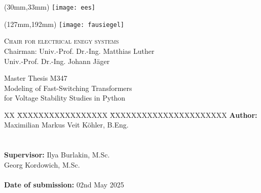 \thispagestyle{empty}
\setcounter{page}{-1}

\begin{textblock*}{\textwidth}(30mm,33mm)
\texttt{[image: ees]}
\end{textblock*}

\begin{textblock*}{\textwidth}(127mm,192mm)
\texttt{[image: fausiegel]}
\end{textblock*}

{\raggedleft
\textsc{Chair for electrical enegy systems}\\
Chairman: Univ.-Prof. Dr.-Ing. Matthias Luther \\
Univ.-Prof. Dr.-Ing. Johann Jäger
\par}

\vspace{51mm}

{\centering

\large{Master Thesis M347} \\	
\Large{Modeling of Fast-Switching Transformers\\for Voltage Stability Studies in Python}

\par}

\vfill

{\raggedright
\begin{tabbing}
XX \= XXXXXXXXXXXXXXXXX \= XXXXXXXXXXXXXXXXXXXXXX \kill
		\> \textbf{Author:} 	\> Maximilian Markus Veit Köhler, B.Eng. \\
		\>								\\
 		\>												\>									\\
		\> \textbf{Supervisor:}		\> Ilya Burlakin, M.Sc. \\
		\> 							\> Georg Kordowich, M.Sc. \\
		\>												\>									\\
		\> \textbf{Date of submission:}	\> 02nd May 2025															
\end{tabbing}
\par}
\cleardoublepage
